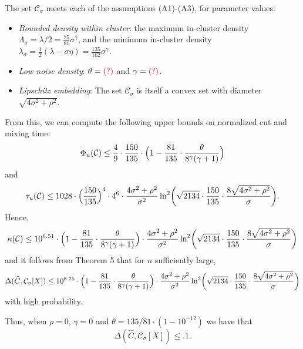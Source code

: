 \documentclass{report}
\newcommand{\1}{\mathbf{1}}
\newcommand{\mc}[1]{\mathcal{#1}}
\newcommand{\wh}[1]{\widehat{#1}}
\theoremstyle{alden}
\theoremstyle{aldenthm}
\theoremstyle{definition}
\theoremstyle{remark}
\begin{document}
The set $\mc{C}_{\sigma}$ meets each of the assumptions (A1)-(A3), for parameter values:
\begin{itemize}
	\item \textit{Bounded density within cluster}: the maximum in-cluster density $\Lambda_{\sigma} = \lambda/2 = \frac{75}{81}\sigma^{\gamma}$, and the minimum in-cluster density  $\lambda_{\sigma} = \frac{1}{2}(\lambda - \sigma \eta) = \frac{135}{162} \sigma^{\gamma}$. 
	\item \textit{Low noise density}: $\theta = \textcolor{red}{(?)}$ and $\gamma = \textcolor{red}{(?)}$. 
	\item \textit{Lipschitz embedding}: The set $\mc{C}_{\sigma}$ is itself a convex set with diameter $\sqrt{4\sigma^2 + \rho^2}$. 
\end{itemize}
From this, we can compute the following upper bounds on normalized cut and mixing time:
\begin{equation*}
\Phi_u(\mc{C}) \leq \frac{4}{9} \cdot \frac{150}{135} \cdot \Bigl(1 - \frac{81}{135} \cdot \frac{\theta}{8^{\gamma}(\gamma + 1)}\Bigr)
\end{equation*}
and
\begin{equation*}
\tau_u(\mc{C}) \leq 1028 \cdot \Bigl(\frac{150}{135}\Bigr)^4 \cdot 4^6 \cdot \frac{4\sigma^2 + \rho^2}{\sigma^2} \ln^2\biggl(\sqrt{2134} \cdot \frac{150}{135} \cdot \frac{8 \sqrt{4\sigma^2 + \rho^2}}{\sigma}\biggr).
\end{equation*}
Hence,
\begin{equation*}
\kappa(\mc{C}) \leq 10^{6.51} \cdot \Bigl(1 - \frac{81}{135} \cdot \frac{\theta}{8^{\gamma}(\gamma + 1)}\Bigr) \cdot \frac{4\sigma^2 + \rho^2}{\sigma^2} \ln^2\biggl(\sqrt{2134} \cdot \frac{150}{135} \cdot \frac{8 \sqrt{4\sigma^2 + \rho^2}}{\sigma}\biggr)
\end{equation*}
and it follows from Theorem 5 that for $n$ sufficiently large,
\begin{equation*}
\Delta(\wh{C},\mc{C}_{\sigma}[X]) \leq 10^{8.75} \cdot \Bigl(1 - \frac{81}{135} \cdot \frac{\theta}{8^{\gamma}(\gamma + 1)}\Bigr) \cdot \frac{4\sigma^2 + \rho^2}{\sigma^2} \ln^2\biggl(\sqrt{2134} \cdot \frac{150}{135} \cdot \frac{8 \sqrt{4\sigma^2 + \rho^2}}{\sigma}\biggr)
\end{equation*}
with high probability.

Thus, when $\rho = 0$, $\gamma = 0$ and $\theta = 135/81 \cdot (1 - 10^{-12})$ we have that
\begin{equation*}
\Delta(\wh{C},\mc{C}_{\sigma}[X]) \leq .1.
\end{equation*}
\end{document}
